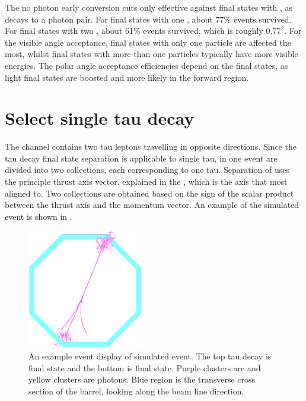 The no photon early conversion cuts only effective against final states with \Ppizero, as \Ppizero decays to a photon pair. For final states with one \Ppizero, about 77\% events survived. For final states with two \Ppizero, about 61\% events survived, which is roughly $0.77^2$. For the visible angle acceptance, final states with only one particle are affected the most, whilst final states with more than one particles typically have more visible energies. The polar angle acceptance efficiencies depend on the final states, as light final states are boosted and more likely in the forward region.





\section{Select single tau decay}

The \eeToTauTau channel contains two tau leptons travelling in opposite directions. Since the tau decay final state separation is applicable to single tau, \PFOs in one event are divided into two collections, each corresponding to one tau. Separation of \PFOs uses the principle thrust axis vector, explained in the , which is the axis that most \PFOs aligned to. Two collections are obtained based on the sign of the scalar product between the thrust axis and the \PFO momentum vector. An example of the simulated \eeToTauTau event is shown in .

\begin{figure}[tbph]
\centering
\includegraphics[width=0.45\textwidth]{tau/tau_evt_dsp2}
\caption{ An example event display of simulated \eeToTauTau event. The top tau decay is \decayRhoFinalStateShort final state and the bottom is \decayThreePionPhotonShort final state. Purple clusters are \Ppipm and yellow clusters are photons.  Blue region is the transverse cross section of the \ECAL barrel, looking along the beam line direction.}
\label{fig:tauEvtDsp}
\end{figure}



